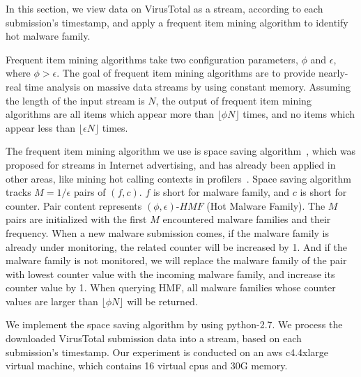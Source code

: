 In this section, we view data on VirusTotal as a stream, according to each submission's timestamp, 
and apply a frequent item mining algorithm to identify hot malware family. 


Frequent item mining algorithms take two configuration parameters, $\phi$ and $\epsilon$, where $\phi > \epsilon$. 
The goal of frequent item mining algorithms are to provide nearly-real time analysis on massive data streams by using constant memory. 
Assuming the length of the input stream is $N$, the output of frequent item mining algorithms 
are all items which appear more than $\lfloor \phi N \rfloor$ times, 
and no items which appear less than  $\lfloor \epsilon N \rfloor$ times. 

The frequent item mining algorithm we use is space saving algorithm~\cite{space-saving}, 
which was proposed for streams in Internet advertising, and has already been applied in other areas, 
like mining hot calling contexts in profilers~\cite{hot-calling-context}.
Space saving algorithm tracks $M=1/\epsilon$ pairs of $(f, c)$. 
$f$ is short for malware family, and $c$ is short for counter.  
Pair content represents $(\phi, \epsilon)\mbox{-}HMF$ (Hot Malware Family). 
The $M$ pairs are initialized with the first $M$ encountered malware families and their frequency. 
When a new malware submission comes, 
if the malware family is already under monitoring, 
the related counter will be increased by 1. 
And if the malware family is not monitored, 
we will replace the malware family of the pair with lowest counter value with the incoming malware family, 
and increase its counter value by 1. 
When querying HMF, 
all malware families whose counter values are larger than $\lfloor \phi N \rfloor$ will be returned. 

\label{sec:eval1}

We implement the space saving algorithm by using python-2.7.
We process the downloaded VirusTotal submission data into a stream, 
based on each submission's timestamp. 
Our experiment is conducted on an aws c4.4xlarge virtual machine, 
which contains 16 virtual cpus and 30G memory. 

